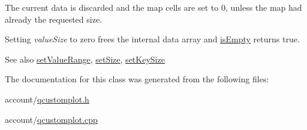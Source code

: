 \-The current data is discarded and the map cells are set to 0, unless the map had already the requested size.

\-Setting {\itshape value\-Size\/} to zero frees the internal data array and \hyperlink{classQCPColorMapData_a986009324aee1fc5f696db46bd03dde5}{is\-Empty} returns true.

\begin{DoxySeeAlso}{\-See also}
\hyperlink{classQCPColorMapData_ada1b2680ba96a5f4175b6d341cf75d23}{set\-Value\-Range}, \hyperlink{classQCPColorMapData_a0d9ff35c299d0478b682bfbcdd9c097e}{set\-Size}, \hyperlink{classQCPColorMapData_ac7ef70e383aface34b44dbde49234b6b}{set\-Key\-Size} 
\end{DoxySeeAlso}


\-The documentation for this class was generated from the following files\-:\begin{DoxyCompactItemize}
\item 
account/\hyperlink{qcustomplot_8h}{qcustomplot.\-h}\item 
account/\hyperlink{qcustomplot_8cpp}{qcustomplot.\-cpp}\end{DoxyCompactItemize}
